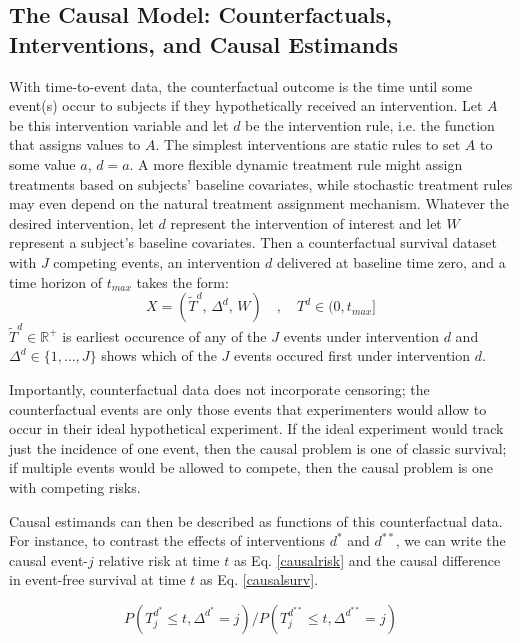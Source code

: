 \documentclass{report}
\newcommand{\1}{\ensuremath{\mathbf{1}}}
\newcommand{\T}{\ensuremath{\widetilde{T}}}
\renewcommand{\L}{\ensuremath{W}}
\begin{document}
\subsection{The Causal Model: Counterfactuals, Interventions, and Causal Estimands}
\label{sec:org3401550}
With time-to-event data, the counterfactual outcome is the time until some event(s) occur to subjects if they hypothetically received an intervention. Let \(A\) be this intervention variable and let \(d\) be the intervention rule, i.e. the function that assigns values to \(A\). The simplest interventions are static rules to set \(A\) to some value \(a\), \(d = a\). A more flexible dynamic treatment rule might assign treatments based on subjects' baseline covariates, while stochastic treatment rules may even depend on the natural treatment assignment mechanism. Whatever the desired intervention, let \(d\) represent the intervention of interest and let \(\L\) represent a subject's baseline covariates. Then a counterfactual survival dataset with \(J\) competing events, an intervention \(d\) delivered at baseline time zero, and a time horizon of \(t_{max}\) takes the form:
\begin{equation}
 X = \left(\T^d,\, \Delta^d,\, \L \right) \quad,\quad T^d \in (0, t_{max}] \label{causaldata}
\end{equation}
\(\T^d \in \mathbb{R}^+\) is earliest occurence of any of the \(J\) events under intervention \(d\) and \(\Delta^d \in \{1, \dots, J\}\) shows which of the \(J\) events occured first under intervention \(d\).

Importantly, counterfactual data does not incorporate censoring; the counterfactual events are only those events that experimenters would allow to occur in their ideal hypothetical experiment. If the ideal experiment would track just the incidence of one event, then the causal problem is one of classic survival; if multiple events would be allowed to compete, then the causal problem is one with competing risks. 

Causal estimands can then be described as functions of this counterfactual data. For instance, to contrast the effects of interventions \(d^*\) and \(d^{**}\), we can write the causal event-\(j\) relative risk at time \(t\) as Eq. \eqref{causalrisk} and the causal difference in event-free survival at time \(t\) as Eq. \eqref{causalsurv}. 

\begin{equation}
P(T^{d^*}_j \leq t, \Delta^{d^*} = j) / P(T^{d^{**}}_j \leq t, \Delta^{d^{**}} = j) \label{causalrisk}
\end{equation}
\end{document}
